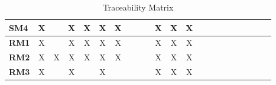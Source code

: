 \documentclass[12pt]{article}
\begin{document}
\begin{table}[H]
\begin{adjustwidth}{-0.8in}{-1.2in}
{\begin{tabular}{c|c|c|c|c|c|c|c|c|c|c|c|c|c|c|c|c|c|c|c|c|c}
\multicolumn{1}{|l|}{\textbf{SM4}}   &      X       &              &       X      &       X      &       X      &       X      &              &              &              &      X       &       X      &       X      &              &              &             &              &             &             &             &             \\ \hline
\multicolumn{1}{|l|}{\textbf{RM1}}   &      X       &              &       X      &       X      &       X      &       X      &              &              &              &      X       &       X      &       X      &              &              &             &              &             &             &             &             \\ \hline
\multicolumn{1}{|l|}{\textbf{RM2}}   &      X       &       X      &       X      &       X      &       X      &       X      &              &              &              &      X       &       X      &       X      &              &              &             &              &             &             &             &             \\ \hline
\multicolumn{1}{|l|}{\textbf{RM3}}   &      X       &              &       X      &              &       X      &              &              &              &              &      X       &       X      &       X      &              &              &             &              &             &             &             &             \\ \hline
\end{tabular}

}
\caption{Traceability Matrix}
    \label{tab:matrix1}
\end{adjustwidth}
\end{table}
\end{document}
